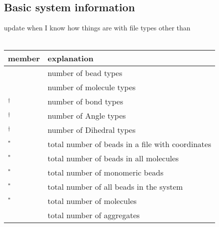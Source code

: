 \subsection[Counts]{Basic system information}\label{ssec:Counts}
\TODO update when I know how things are with file types other than \vtf\\
\\
\vspace{-1.75em}
\begin{longtable}{L{0.36\textwidth}p{0.665\textwidth}}
  \toprule
  member           & explanation \\
  \midrule
             & number of bead types\\
         & number of molecule types\\
  $^\dag$    & number of bond types\\
  $^\dag$   & number of Angle types\\
  $^\dag$ & number of Dihedral types\\
  $^*$              & total number of beads in a file with
                                      coordinates\\
  $^*$             & total number of beads in all molecules\\
  $^*$           & total number of monomeric beads\\
  $^*$         & total number of all beads in the system\\
  $^*$          & total number of molecules\\
               & total number of aggregates\\
  \bottomrule
\end{longtable}

